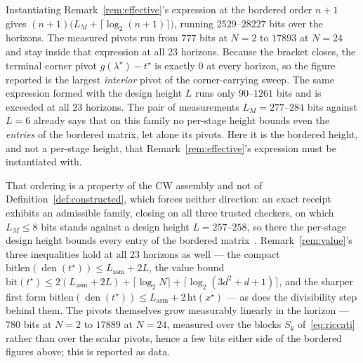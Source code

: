 \documentclass[11pt]{article}
\theoremstyle{definition}
\theoremstyle{remark}
\DeclareMathOperator{\den}{den}
\renewcommand{\_}{\ifdim\fontdimen3\font=0pt\relax\char`\_\else\textunderscore\fi\hspace{0pt}}
\begin{document}
Instantiating Remark~\ref{rem:effective}'s expression at the bordered order
$n{+}1$ gives $(n{+}1)\bigl(L_M+\lceil\log_2(n{+}1)\rceil\bigr)$, running
$2529$--$28227$ bits over the horizons. The measured pivots run from $777$
bits at $N{=}2$ to $17893$ at $N{=}24$ and stay inside that expression at
all $23$ horizons. Because the
bracket closes, the terminal corner pivot $g(\lambda^\star)-t^\star$ is
exactly $0$ at every horizon, so the figure reported is the largest
\emph{interior} pivot of the corner-carrying sweep. The same expression formed
with the design height $L$ runs only $90$--$1261$ bits and is exceeded at all
$23$ horizons. The pair of measurements $L_M=277$--$284$ bits against $L=6$
already says that on this family no per-stage height bounds even the
\emph{entries} of the bordered matrix, let alone its pivots. Here it is the
bordered height, and not a per-stage height, that
Remark~\ref{rem:effective}'s expression must be instantiated with.

That ordering is a property of the CW assembly and not of
Definition~\ref{def:constructed}, which forces neither direction: an exact
receipt exhibits an admissible family, closing on all three trusted
checkers, on which $L_M\le8$ bits stands against a design height
$L=257$--$258$, so there the per-stage design height bounds every entry of
the bordered matrix~\cite{leannote}. Remark~\ref{rem:value}'s three inequalities hold at all
$23$ horizons as well --- the compact
$\mathrm{bitlen}(\den(t^\star))\le L_{\mathrm{asm}}+2L$, the value bound
$\mathrm{bit}(t^\star)\le2(L_{\mathrm{asm}}+2L)+\lceil\log_2N\rceil
+\lceil\log_2(3d^2{+}d{+}1)\rceil$, and the sharper first form
$\mathrm{bitlen}(\den(t^\star))\le L_{\mathrm{asm}}+2\,\mathrm{ht}(x^\star)$
--- as does the divisibility step behind them. The pivots themselves grow
measurably linearly in the horizon --- $780$ bits at $N{=}2$ to $17889$ at
$N{=}24$, measured over the blocks $S_k$ of~\eqref{eq:riccati} rather than
over the scalar pivots, hence a few bits either side of the bordered figures
above; this is reported as data.
\end{document}
